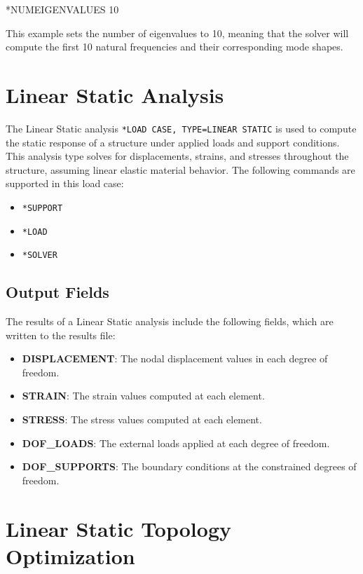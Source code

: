 \begin{codeBlock}
*NUMEIGENVALUES
10
\end{codeBlock}

This example sets the number of eigenvalues to 10, meaning that the solver will compute the first 10 natural frequencies and their corresponding mode shapes.


\section{Linear Static Analysis}
\label{sec:linear_static}

The Linear Static analysis \texttt{*LOAD CASE, TYPE=LINEAR STATIC} is used to compute the static response of a
structure under applied loads and support conditions. This analysis type solves for displacements,
strains, and stresses throughout the structure, assuming linear elastic material behavior.
The following commands are supported in this load case:

\begin{itemize}
    \item \texttt{*SUPPORT}
    \item \texttt{*LOAD}
    \item \texttt{*SOLVER}
\end{itemize}

\subsection{Output Fields}
The results of a Linear Static analysis include the following fields, which are written to the results file:

\begin{itemize}
    \item \textbf{DISPLACEMENT}: The nodal displacement values in each degree of freedom.
    \item \textbf{STRAIN}: The strain values computed at each element.
    \item \textbf{STRESS}: The stress values computed at each element.
    \item \textbf{DOF\_LOADS}: The external loads applied at each degree of freedom.
    \item \textbf{DOF\_SUPPORTS}: The boundary conditions at the constrained degrees of freedom.
\end{itemize}

\section{Linear Static Topology Optimization}
\label{sec:linear_static_topo}

